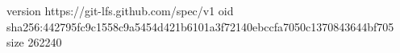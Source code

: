 version https://git-lfs.github.com/spec/v1
oid sha256:442795fc9c1558c9a5454d421b6101a3f72140ebccfa7050c1370843644bf705
size 262240
